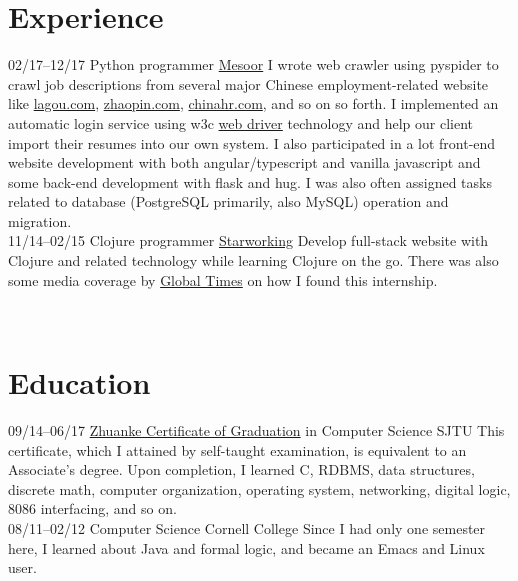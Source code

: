 \documentclass[a4paper]{friggeri-cv}
\begin{document}
\section{Experience}
\begin{entrylist}
  \entry
  {02/17--12/17}
  {Python programmer}
  {\href{https://www.mesoor.com/}{Mesoor}}
  {I wrote web crawler using pyspider to crawl job descriptions from several major Chinese employment-related website like \href{https://www.lagou.com/}{lagou.com}, \href{https://www.zhaopin.com/}{zhaopin.com}, \href{http://www.chinahr.com/}{chinahr.com}, and so on so forth.  I implemented an automatic login service using w3c \href{https://github.com/w3c/web-platform-tests/pull/6743}{web driver} technology and help our client import their resumes into our own system.  I also participated in a lot front-end website development with both angular/typescript and vanilla javascript and some back-end development with flask and hug.  I was also often assigned tasks related to database (PostgreSQL primarily, also MySQL) operation and migration.  \\}
  \entry
  {11/14--02/15}
  {Clojure programmer}
  {\href{http://www.starworking.com/}{Starworking}}
  {Develop full-stack website with Clojure and related technology while learning Clojure on the go.  There was also some media coverage by \href{http://www.globaltimes.cn/content/871111.shtml}{Global Times} on how I found this internship.}
\end{entrylist}
\\
\section{Education}
\begin{entrylist}
  \entry
  {09/14--06/17}
  {\href{http://www.chsi.com.cn/en/news/201312/20131202/663878204.html}{Zhuanke Certificate of Graduation} in Computer Science}
  {SJTU}
  {This certificate, which I attained by self-taught examination, is equivalent to an Associate's degree.  Upon completion, I learned C, RDBMS, data structures, discrete math, computer organization, operating system, networking, digital logic, 8086 interfacing, and so on.\\}
  \entry
  {08/11--02/12}
  {Computer Science}
  {Cornell College}
  {Since I had only one semester here, I learned about Java and formal logic, and became an Emacs and Linux user.}
\end{entrylist}

\end{document}
